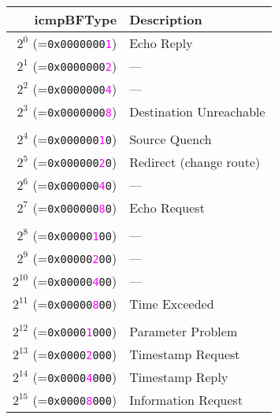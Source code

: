 \documentclass[documentation]{subfiles}
\begin{document}
\begin{minipage}{0.45\textwidth}
    \begin{longtable} {rl}
        \toprule
        {\bf icmpBFType} & {\bf Description} \\
        \midrule\endhead%
        $2^{0}$  (={\tt 0x0000000\textcolor{magenta}{1}}) & Echo Reply \\
        $2^{1}$  (={\tt 0x0000000\textcolor{magenta}{2}}) & --- \\
        $2^{2}$  (={\tt 0x0000000\textcolor{magenta}{4}}) & --- \\
        $2^{3}$  (={\tt 0x0000000\textcolor{magenta}{8}}) & Destination Unreachable \\
        \\
        $2^{4}$  (={\tt 0x000000\textcolor{magenta}{1}0}) & Source Quench \\
        $2^{5}$  (={\tt 0x000000\textcolor{magenta}{2}0}) & Redirect (change route) \\
        $2^{6}$  (={\tt 0x000000\textcolor{magenta}{4}0}) & --- \\
        $2^{7}$  (={\tt 0x000000\textcolor{magenta}{8}0}) & Echo Request \\
        \\
        $2^{8}$  (={\tt 0x00000\textcolor{magenta}{1}00}) & --- \\
        $2^{9}$  (={\tt 0x00000\textcolor{magenta}{2}00}) & --- \\
        $2^{10}$ (={\tt 0x00000\textcolor{magenta}{4}00}) & --- \\
        $2^{11}$ (={\tt 0x00000\textcolor{magenta}{8}00}) & Time Exceeded \\
        \\
        $2^{12}$ (={\tt 0x0000\textcolor{magenta}{1}000}) & Parameter Problem \\
        $2^{13}$ (={\tt 0x0000\textcolor{magenta}{2}000}) & Timestamp Request \\
        $2^{14}$ (={\tt 0x0000\textcolor{magenta}{4}000}) & Timestamp Reply \\
        $2^{15}$ (={\tt 0x0000\textcolor{magenta}{8}000}) & Information Request \\
        \bottomrule
    \end{longtable}
\end{minipage}
\hfill
\end{document}
